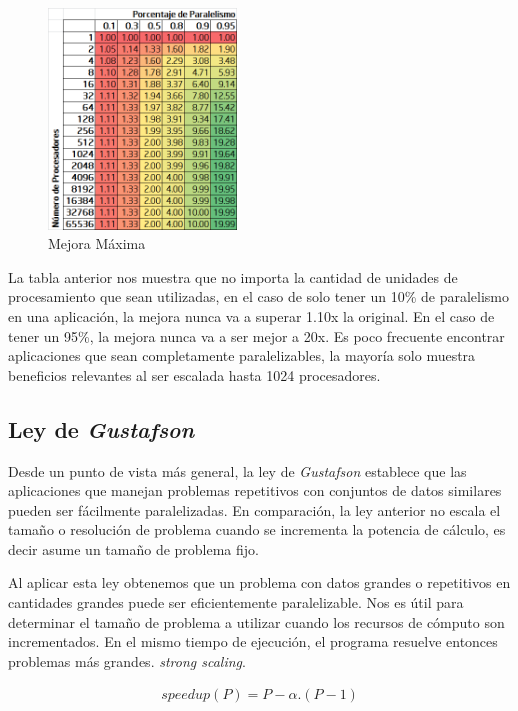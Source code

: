 \documentclass[a4paper]{report}
\begin{document}
\begin{figure}[H]
\begin{center}
\includegraphics[width=5cm]{amdahl.png}
\caption{Mejora M\'axima}
\end{center}
\end{figure}

La tabla anterior nos muestra que no importa la cantidad de unidades de procesamiento que sean utilizadas, en el caso de solo tener un 10\% de paralelismo
en una aplicaci\'on, la mejora nunca va a superar 1.10x la original. En el caso de tener un 95\%, la mejora nunca va a ser mejor a 20x. Es poco frecuente encontrar
aplicaciones que sean completamente paralelizables, la mayor\'ia solo muestra
beneficios relevantes al ser escalada hasta 1024 procesadores.

\subsection{Ley de {\it Gustafson}}

Desde un punto de vista m\'as general, la ley de {\it Gustafson}
\cite{gustafson} establece que las aplicaciones que manejan problemas
repetitivos con conjuntos de datos similares pueden ser f\'acilmente
paralelizadas. En comparaci\'on, la ley anterior no escala el tama\~no o
resoluci\'on de problema cuando se incrementa la potencia de c\'alculo, es
decir asume un tama\~no de problema fijo. 

\bigskip

Al aplicar esta ley obtenemos que un problema con datos grandes o repetitivos en cantidades grandes puede ser
eficientemente paralelizable. Nos es \'util para determinar el tama\~no de problema a utilizar cuando los recursos de c\'omputo son incrementados.
En el mismo tiempo de ejecuci\'on, el programa resuelve entonces problemas m\'as grandes.
{\it strong scaling}.

\begin{eqnarray}
speedup(P) = P - \alpha . ( P - 1)
\end{eqnarray}
\end{document}

